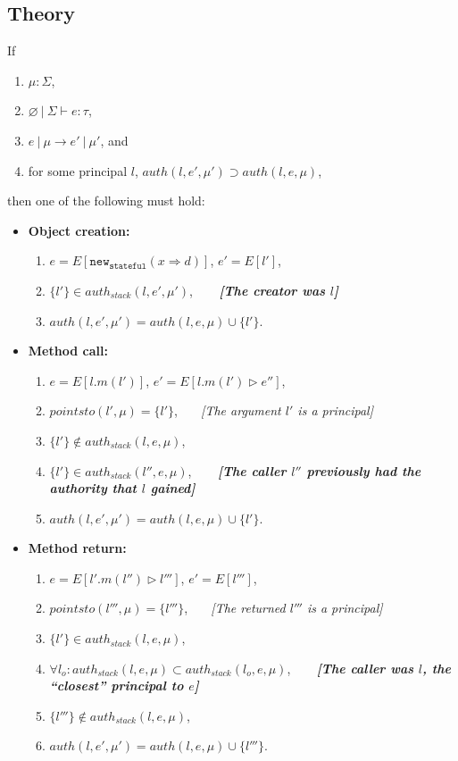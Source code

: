 \documentclass{llncs}
\newcommand{\keywadj}[1]{\mathtt{#1}}
\begin{document}
\newpage

\subsection{Theory}

\begin{theorem} If
\begin{enumerate}
\item $\mu : \Sigma$,
\item $\varnothing~|~\Sigma \vdash e : \tau$,
\item $e~|~\mu \longrightarrow e'~|~\mu'$, and
\item for some principal $l$, $auth(l, e', \mu') \supset auth(l, e, \mu)$,
\end{enumerate}
then one of the following must hold:
\begin{itemize}
  \item \textbf{Object creation:}
  \begin{enumerate}
  \item $e = E[\keywadj{new}_{\keywadj{stateful}}(x \Rightarrow d)]$, $e' = E[l']$,
  \item $\{ l' \} \in auth_{stack}(l, e', \mu')$, \textbf{\emph{~~~[The creator was $l$]}}
  \item $auth(l, e', \mu') = auth(l, e, \mu) \cup \{ l' \}$.\\
  \end{enumerate}
  \item \textbf{Method call:}
  \begin{enumerate}
  \item $e = E[l.m(l')]$, $e' = E[l.m(l') \rhd e'']$,
  \item $pointsto(l',\mu) = \{ l' \}$, \emph{~~~[The argument $l'$ is a principal]}
  \item $\{ l' \} \not\in auth_{stack}(l, e, \mu)$,
  \item $\{ l' \} \in auth_{stack}(l'', e, \mu)$, \textbf{\emph{~~~[The caller $l''$ previously had the authority that $l$ gained]}}
  \item $auth(l, e', \mu') = auth(l, e, \mu) \cup \{ l' \}$.\\
  \end{enumerate}
  \item \textbf{Method return:}
  \begin{enumerate}
  \item $e = E[l'.m(l'') \rhd l''']$, $e' = E[l''']$,
  \item $pointsto(l''',\mu) = \{ l''' \}$, \emph{~~~[The returned $l'''$ is a principal]}
  \item $\{ l' \} \in auth_{stack}(l, e, \mu)$,
  \item $\forall l_o : auth_{stack}(l, e, \mu) \subset auth_{stack}(l_o, e, \mu)$, \textbf{\emph{~~~[The caller was $l$, the ``closest'' principal to $e$]}}
  \item $\{ l''' \} \not\in auth_{stack}(l, e, \mu)$,
  \item $auth(l, e', \mu') = auth(l, e, \mu) \cup \{ l''' \}$.\\
  \end{enumerate}
\end{itemize}


\end{theorem}
\end{document}
